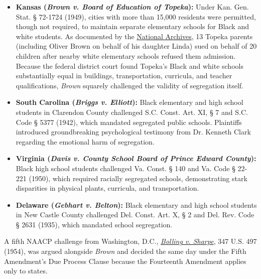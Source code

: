 \documentclass[12pt]{article}
\begin{document}
\begin{itemize}
  \item \textbf{Kansas (\textit{Brown v. Board of Education of Topeka}):} Under Kan. Gen. Stat. \S{} 72-1724 (1949), cities with more than 15,000 residents were permitted, though not required, to maintain separate elementary schools for Black and white students. As documented by the \href{https://www.archives.gov/education/lessons/brown-v-board}{National Archives}, 13 Topeka parents (including Oliver Brown on behalf of his daughter Linda) sued on behalf of 20 children after nearby white elementary schools refused them admission. Because the federal district court found Topeka's Black and white schools substantially equal in buildings, transportation, curricula, and teacher qualifications, \textit{Brown} squarely challenged the validity of segregation itself.
  \item \textbf{South Carolina (\textit{Briggs v. Elliott}):} Black elementary and high school students in Clarendon County challenged S.C. Const. Art. XI, \S{} 7 and S.C. Code \S{} 5377 (1942), which mandated segregated public schools. Plaintiffs introduced groundbreaking psychological testimony from Dr. Kenneth Clark regarding the emotional harm of segregation.
  \item \textbf{Virginia (\textit{Davis v. County School Board of Prince Edward County}):} Black high school students challenged Va. Const. \S{} 140 and Va. Code \S{} 22-221 (1950), which required racially segregated schools, demonstrating stark disparities in physical plants, curricula, and transportation.
  \item \textbf{Delaware (\textit{Gebhart v. Belton}):} Black elementary and high school students in New Castle County challenged Del. Const. Art. X, \S{} 2 and Del. Rev. Code \S{} 2631 (1935), which mandated school segregation.
\end{itemize}

A fifth NAACP challenge from Washington, D.C., \href{https://supreme.justia.com/cases/federal/us/347/497/}{\textit{Bolling v. Sharpe}}, 347 U.S. 497 (1954), was argued alongside \textit{Brown} and decided the same day under the Fifth Amendment's Due Process Clause because the Fourteenth Amendment applies only to states.
\end{document}
